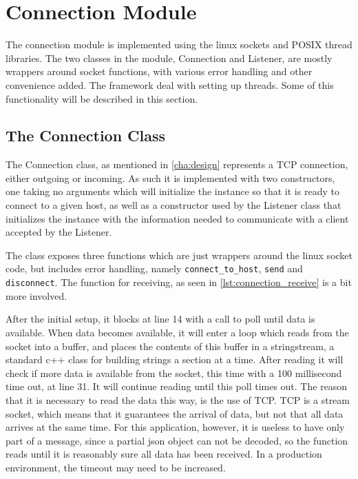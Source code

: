 \section{Connection Module}

The connection module is implemented using the linux sockets and POSIX thread libraries. The two classes in the module, Connection and Listener, are mostly wrappers around socket functions,
with various error handling and other convenience added. The framework deal with setting up threads. Some of this functionality will be described in this section.

\subsection{The Connection Class}

The Connection class, as mentioned in \autoref{cha:design} represents a TCP connection, either outgoing or incoming. As such it is implemented with two constructors,
one taking no arguments which will initialize the instance so that it is ready to connect to a given host, as well as a constructor used by the Listener class that initializes the instance
with the information needed to communicate with a client accepted by the Listener.

The class exposes three functions which are just wrappers around the linux socket code, but includes error handling, namely \lstinline|connect_to_host|, \lstinline|send| and \lstinline|disconnect|. The function for receiving,
as seen in \autoref{lst:connection_receive} is a bit more involved.

After the initial setup, it blocks at line 14 with a call to poll until data is available. When data becomes available,
it will enter a loop which reads from the socket into a buffer, and places the contents of this buffer in a stringstream, a standard c++ class for building strings a section at a time.
After reading it will check if more data is available from the socket, this time with a 100 millisecond time out, at line 31. It will continue reading until this poll times out. The reason
that it is necessary to read the data this way, is the use of TCP. TCP is a stream socket, which means that it guarantees the arrival of data, but not that all data arrives at the same time.
For this application, however, it is useless to have only part of a message, since a partial \ac{json} object can not be decoded, so the function reads until it is reasonably sure all data
has been received. In a production environment, the timeout may need to be increased.

